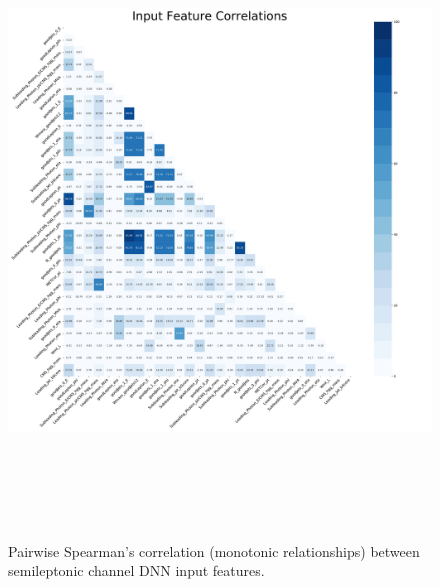 \begin{figure}
\caption{Pairwise Spearman's correlation (monotonic relationships) between semileptonic channel DNN input features.}
\setlength{\unitlength}{1mm}
\begin{center}
\mbox{
\includegraphics*[height=150mm]{Sections/HHWWgg/images/DNN/correlation_plot.pdf}
  }
\end{center}
\label{fig:inputvarcorrelation}
\end{figure}



